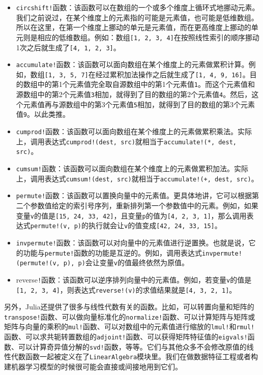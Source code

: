 \begin{itemize}
\item \verb|circshift!|函数：该函数可以在数组的一个或多个维度上循环式地挪动元素。我们之前说过，在某个维度上的元素指的可能是元素值，也可能是低维数组。所以在这里，在第一个维度上挪动的单元是元素值，而在更高维度上挪动的单元则是相应的低维数组。例如：数组\verb|[1, 2, 3, 4]|在按照线性索引的顺序挪动1次之后就生成了\verb|[4, 1, 2, 3]|。
\item \verb|accumulate!|函数：该函数可以面向数组在某个维度上的元素做累积计算。例如，数组\verb|[1, 3, 5, 7]|在经过累积加法操作之后就生成了\verb|[1, 4, 9, 16]|。目的数组中的第1个元素值完全取自源数组中的第1个元素值\verb|1|。而这个元素值和源数组中的第2个元素值\verb|3|相加，就得到了目的数组的第2个元素值\verb|4|。然后，这个元素值再与源数组中的第3个元素值\verb|5|相加，就得到了目的数组的第3个元素值\verb|9|。以此类推。
\item  \verb|cumprod!|函数：该函数可以面向数组在某个维度上的元素做累积乘法。实际上，调用表达式\verb|cumprod!(dest, src)|就相当于\verb|accumulate!(*, dest, src)|。
\item \verb|cumsum!|函数：该函数可以面向数组在某个维度上的元素做累积加法。实际上，调用表达式\verb|cumsum!(dest, src)|就相当于\verb|accumulate!(+, dest, src)|。
\item \verb|permute!|函数：该函数可以置换向量中的元素值。更具体地讲，它可以根据第二个参数值给定的索引号序列，重新排列第一个参数值中的元素。例如，如果变量\verb|v|的值是\verb|[15, 24, 33, 42]|，且变量\verb|p|的值为\verb|[4, 2, 3, 1]|，那么调用表达式\verb|permute!(v, p)|的执行就会让\verb|v|的值变成\verb|[42, 24, 33, 15]|。
\item \verb|invpermute!|函数：该函数可以对向量中的元素值进行逆置换。也就是说，它的功能与\verb|permute!|函数的功能是互逆的。例如，调用表达式\verb|invpermute!(permute!(v, p), p)|会让变量\verb|v|的值最终依然为原值。
\item reverse\verb|!|函数：该函数可以逆序排列向量中的元素值。例如，若变量\verb|v|的值是\verb|[1, 2, 3, 4]|，则表达式\verb|reverse!(v)|的求值结果就是\verb|[4, 3, 2, 1]|。
\end{itemize}

另外，Julia还提供了很多与线性代数有关的函数。比如，可以转置向量和矩阵的\verb|transpose!|函数、可以做向量标准化的\verb|normalize!|函数、可以计算矩阵与矩阵或矩阵与向量的乘积的\verb|mul!|函数、可以对数组中的元素值进行缩放的\verb|lmul!|和\verb|rmul!|函数、可以求共轭转置数组的\verb|adjoint!|函数、可以获得矩阵特征值的\verb|eigvals!|函数、可以计算奇异值分解的\verb|svd!|函数，等等。它们与其他众多不会修改原值的线性代数函数一起被定义在了\verb|LinearAlgebra|模块里。我们在做数据特征工程或者构建机器学习模型的时候很可能会直接或间接地用到它们。